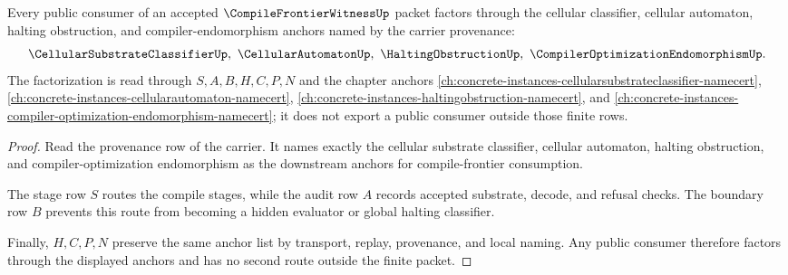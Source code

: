 \begin{theorem}
\label{thm:compile-frontier-witness-consumer-nonescape}
Every public consumer of an accepted $\CompileFrontierWitnessUp$ packet factors through the cellular classifier, cellular automaton, halting obstruction, and compiler-endomorphism anchors named by the carrier provenance:
$$
\CellularSubstrateClassifierUp,\ \CellularAutomatonUp,\ \HaltingObstructionUp,\ \CompilerOptimizationEndomorphismUp.
$$
The factorization is read through $S,A,B,H,C,P,N$ and the chapter anchors \autoref{ch:concrete-instances-cellularsubstrateclassifier-namecert}, \autoref{ch:concrete-instances-cellularautomaton-namecert}, \autoref{ch:concrete-instances-haltingobstruction-namecert}, and \autoref{ch:concrete-instances-compiler-optimization-endomorphism-namecert}; it does not export a public consumer outside those finite rows.
\end{theorem}
\begin{proof}
Read the provenance row of the carrier. It names exactly the cellular substrate classifier, cellular automaton, halting obstruction, and compiler-optimization endomorphism as the downstream anchors for compile-frontier consumption.

The stage row $S$ routes the compile stages, while the audit row $A$ records accepted substrate, decode, and refusal checks. The boundary row $B$ prevents this route from becoming a hidden evaluator or global halting classifier.

Finally, $H,C,P,N$ preserve the same anchor list by transport, replay, provenance, and local naming. Any public consumer therefore factors through the displayed anchors and has no second route outside the finite packet.
\end{proof}

